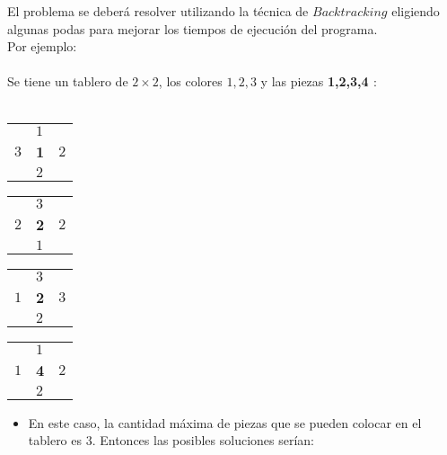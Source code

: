 \documentclass[11pt, a4paper, twoside]{article}
\begin{document}
El problema se deberá resolver utilizando la técnica de $Backtracking$ eligiendo algunas podas para mejorar los tiempos de ejecución del programa. \\

Por ejemplo: \\ 
\\
Se tiene un tablero de $2\times 2$, los colores $1,2,3$ y las piezas \bf 1,\bf 2,\bf 3,\bf 4 $:$ \\
\\

\begin{minipage}{0.2\textwidth}
	\begin{tabular}{ |l l l|}
		\hline
			 & $1$   &       \\
		$3$  & \bf 1 &   $2$ \\ 
			 & $2$   &       \\
		\hline
	\end{tabular}
\end{minipage}
\begin{minipage}{0.2\textwidth}
	\begin{tabular}{ |l l l|}
		\hline
			 & $3$   &       \\
		$2$  & \bf 2 & $2$ \\ 
			 & $1$   &       \\
		\hline
	\end{tabular}
\end{minipage}
\begin{minipage}{0.2\textwidth}
	\begin{tabular}{ |l l l|}
		\hline
			 & $3$    &       \\
		$1$  & \bf 2  & $3$ \\ 
			 & $2$    &       \\
		\hline
	\end{tabular}
\end{minipage}
\begin{minipage}{0.2\textwidth}
	\begin{tabular}{ |l l l|}
		\hline
			 & $1$    &       \\
		$1$  & \bf 4  & $2$   \\ 
			 & $2$    &       \\
		\hline
	\end{tabular} 
\end{minipage}

\begin{itemize}
	\item \textnormal{En este caso, la cantidad máxima de piezas que se pueden colocar en el tablero es $3$. Entonces las posibles soluciones serían:} 
\end{itemize}
\end{document}
